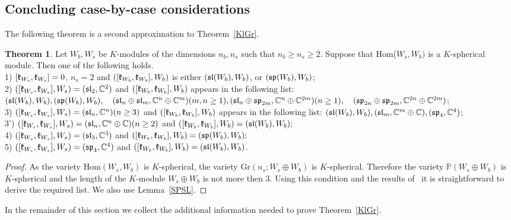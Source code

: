 \documentclass[12pt]{amsart}
\theoremstyle{definition}\newtheorem{theorem}{Theorem}[section]
\theoremstyle{definition}\newtheorem{definition}[proposition]{Definition}
\theoremstyle{remark}\newtheorem{example}[proposition]{Example}
\begin{document}
\subsection{Concluding case-by-case considerations} The following theorem is a second approximation to Theorem~\ref{KlGr}.
\begin{theorem} Let $W_b, W_s$ be $K$-modules of the dimensions $n_b, n_s$ such that $n_b\ge n_s\ge 2$. Suppose that Hom($W_s, W_b)$ is a
$K$-spherical module. Then one of the following holds.\\1) $[\frak k_{W_s}, \frak k_{W_s}]=0$, $n_s=2$ and $([\frak k_{W_b}, \frak k_{W_b}], W_b)$ is either $(\frak{sl}(W_b), W_b)$, or $(\frak{sp}(W_b), W_b)$;\\2) $([\frak k_{W_s}, \frak k_{W_s}], W_s)=(\frak{sl}_2, \mathbb C^2)$ and $([\frak k_{W_b}, \frak k_{W_b}], W_b)$ appears in the following list: $(\frak{sl}(W_b), W_b), (\frak{sp}(W_b), W_b),\hspace{10pt} (\frak{sl}_n\oplus\frak{sl}_m, \mathbb C^n\oplus\mathbb C^m) \\(m, n\ge1), (\frak{sl}_n\oplus\frak{sp}_{2m}, \mathbb C^n\oplus\mathbb C^{2m}) (n\ge1),\hspace{10pt} (\frak{sp}_{2n}\oplus\frak{sp}_{2m}, \mathbb C^{2n}\oplus\mathbb C^{2m})$;\\3) $([\frak k_{W_s}, \frak k_{W_s}], W_s)=(\frak{sl}_n,\mathbb C^n) (n \ge 3)$ and $([\frak k_{W_b}, \frak k_{W_b}], W_b)$ appears in the following list: $(\frak{sl}(W_b), W_b), (\frak{sl}_m,\mathbb C^m\oplus\mathbb C), (\frak{sp}_4, \mathbb C^4)$;\\3') $([\frak k_{W_s}, \frak k_{W_s}], W_s)=(\frak{sl}_n, \mathbb C^n\oplus\mathbb C) (n \ge 2)$ and $([\frak k_{W_b}, \frak k_{W_b}], W_b)=(\frak{sl}(W_b), W_b);$\\4) $([\frak k_{W_s}, \frak k_{W_s}], W_s)=(\frak{sl}_3, \mathbb C^3)$ and $([\frak k_{W_b}, \frak k_{W_b}], W_b)=(\frak{sp}(W_b), W_b);$\\5) $([\frak k_{W_s}, \frak k_{W_s}], W_s)=(\frak{sp}_4, \mathbb C^4)$ and $([\frak k_{W_b}, \frak k_{W_b}], W_b)=(\frak{sl}(W_b), W_b)$.\end{theorem}
\begin{proof} As the variety Hom$(W_s, W_b)$ is $K$-spherical, the variety Gr$(n_s; W_s\oplus W_b)$ is $K$-spherical. Therefore the
variety $\mathbb P(W_s\oplus W_b)$ is $K$-spherical and the length of the $K$-module $W_s\oplus W_b$ is not more then 3. Using this condition
and the results of~\cite{BR} it is straightforward to derive the required list. We also use Lemma~\ref{SPSL}.\end{proof}
In the remainder of this section we collect the additional information needed to prove Theorem~\ref{KlGr}.
\end{document}

